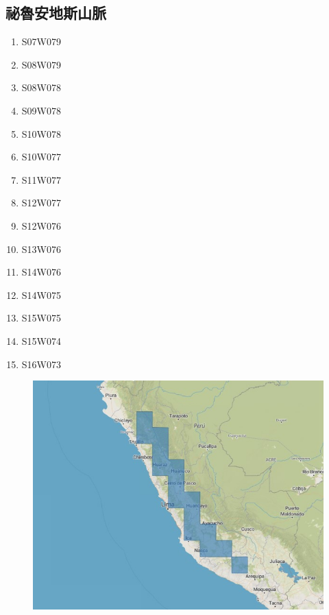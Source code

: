 \documentclass[a4paper, 12pt]{article}
\begin{document}
\begin{appendices}
\subsection{祕魯安地斯山脈}
\begin{multicols}{3}
\begin{enumerate}
    \item S07W079
    \item S08W079
    \item S08W078
    \item S09W078
    \item S10W078
    \item S10W077
    \item S11W077
    \item S12W077
    \item S12W076
    \item S13W076
    \item S14W076
    \item S14W075
    \item S15W075
    \item S15W074
    \item S16W073
\end{enumerate}
\end{multicols}
\begin{figure}[H]
    \centering
    \includegraphics[width=0.8\linewidth]{fig/a3.jpg}
\end{figure}

\end{appendices}
\end{document}
